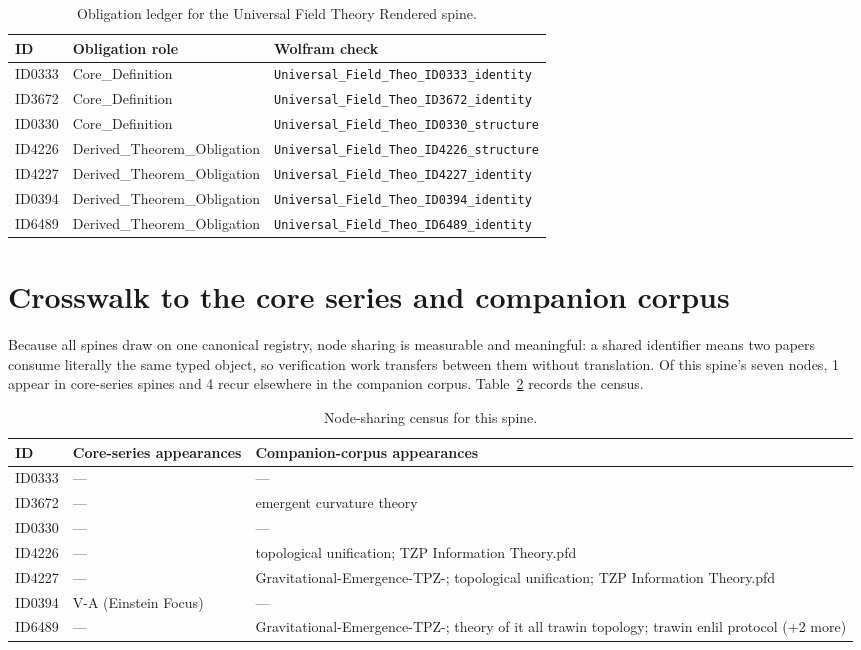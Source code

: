 \documentclass[11pt]{article}
\theoremstyle{remark}
\begin{document}
\begin{table}[ht]
\centering
\small
\caption{Obligation ledger for the Universal Field Theory Rendered spine.}
\label{tab:obligations}
\begin{tabular}{llp{6.2cm}}
\toprule
ID & Obligation role & Wolfram check \\
\midrule
ID0333 & Core\_Definition & \texttt{Universal\_Field\_Theo\_ID0333\_identity} \\
ID3672 & Core\_Definition & \texttt{Universal\_Field\_Theo\_ID3672\_identity} \\
ID0330 & Core\_Definition & \texttt{Universal\_Field\_Theo\_ID0330\_structure} \\
ID4226 & Derived\_Theorem\_Obligation & \texttt{Universal\_Field\_Theo\_ID4226\_structure} \\
ID4227 & Derived\_Theorem\_Obligation & \texttt{Universal\_Field\_Theo\_ID4227\_identity} \\
ID0394 & Derived\_Theorem\_Obligation & \texttt{Universal\_Field\_Theo\_ID0394\_identity} \\
ID6489 & Derived\_Theorem\_Obligation & \texttt{Universal\_Field\_Theo\_ID6489\_identity} \\
\bottomrule
\end{tabular}
\end{table}

\section{Crosswalk to the core series and companion corpus}
\label{sec:crosswalk}

Because all spines draw on one canonical registry, node sharing is measurable and meaningful: a shared identifier means two papers consume literally the same typed object, so verification work transfers between them without translation. Of this spine's seven nodes, 1 appear in core-series spines and 4 recur elsewhere in the companion corpus. Table~\ref{tab:crosswalk} records the census.

\begin{table}[ht]
\centering
\small
\caption{Node-sharing census for this spine.}
\label{tab:crosswalk}
\begin{tabular}{lp{4.4cm}p{6.6cm}}
\toprule
ID & Core-series appearances & Companion-corpus appearances \\
\midrule
ID0333 & --- & --- \\
ID3672 & --- & emergent curvature theory \\
ID0330 & --- & --- \\
ID4226 & --- & topological unification; TZP Information Theory.pfd \\
ID4227 & --- & Gravitational-Emergence-TPZ-; topological unification; TZP Information Theory.pfd \\
ID0394 & V-A (Einstein Focus) & --- \\
ID6489 & --- & Gravitational-Emergence-TPZ-; theory of it all trawin topology; trawin enlil protocol (+2 more) \\
\bottomrule
\end{tabular}
\end{table}
\end{document}
